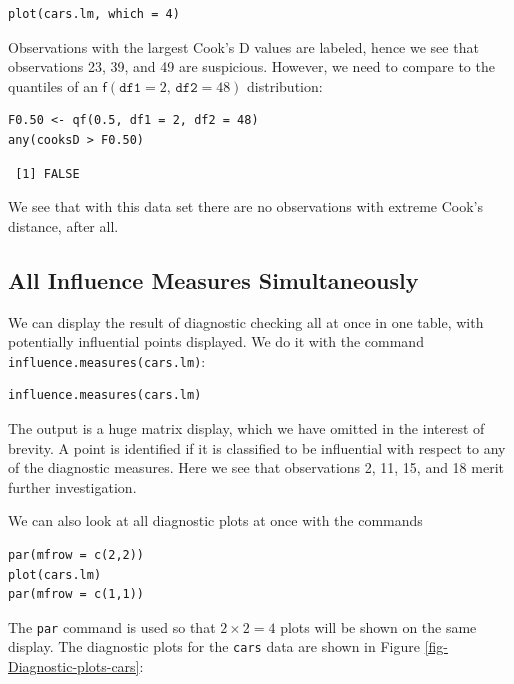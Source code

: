 \documentclass[captions=tableheading]{scrbook}
\begin{document}
\begin{verbatim}
plot(cars.lm, which = 4)
\end{verbatim}





Observations with the largest Cook's D values are labeled, hence we see that observations 23, 39, and 49 are suspicious. However, we need to compare to the quantiles of an \( \mathsf{f}(\mathtt{df1} = 2, \, \mathtt{df2} = 48) \) distribution:


\begin{verbatim}
F0.50 <- qf(0.5, df1 = 2, df2 = 48)
any(cooksD > F0.50)
\end{verbatim}

\begin{verbatim}
 [1] FALSE
\end{verbatim}

We see that with this data set there are no observations with extreme Cook's distance, after all.
\subsection{All Influence Measures Simultaneously}
\label{sec-11-5-5}


We can display the result of diagnostic checking all at once in one table, with potentially influential points displayed. We do it with the command \texttt{influence.measures(cars.lm)}:


\begin{verbatim}
influence.measures(cars.lm)
\end{verbatim}

The output is a huge matrix display, which we have omitted in the interest of brevity. A point is identified if it is classified to be influential with respect to any of the diagnostic measures. Here we see that observations 2, 11, 15, and 18 merit further investigation.  

We can also look at all diagnostic plots at once with the commands


\begin{verbatim}
par(mfrow = c(2,2))
plot(cars.lm)
par(mfrow = c(1,1))
\end{verbatim}

The \texttt{par} command is used so that \(2\times 2 = 4\) plots will be shown on the same display. The diagnostic plots for the \texttt{cars} data are shown in Figure \ref{fig-Diagnostic-plots-cars}:
\end{document}
